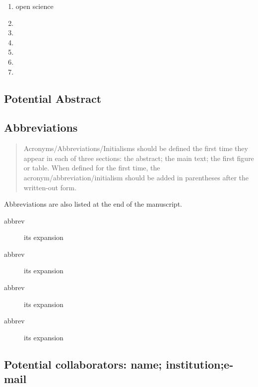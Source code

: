 \documentclass[11pt,letterpaper]{article}
\begin{document}
\begin{enumerate}
\item open science
\item 

\item 

\item 

\item 

\item 

\item 
\end{enumerate}



\subsection{Potential Abstract}
\label{sec:org150ba8d}


\subsection{Abbreviations}
\label{sec:org913e826}


\begin{quote}
Acronyms/Abbreviations/Initialisms should be defined the first time they
appear in each of three sections: the abstract; the main text; the first
figure or table. When defined for the first time, the
acronym/abbreviation/initialism should be added in parentheses after the
written-out form.
\end{quote}

Abbreviations are also listed at the end of the manuscript.

\begin{description}
\item[{abbrev}] its expansion

\item[{abbrev}] its expansion

\item[{abbrev}] its expansion

\item[{abbrev}] its expansion
\end{description}


\subsection{Potential collaborators: name; institution;e-mail}
\label{sec:orge6a433e}
\end{document}
